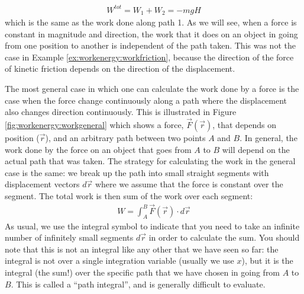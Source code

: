 \begin{example}
\begin{align*}
W^{tot} = W_1 + W_2 = -mgH
\end{align*}
which is the same as the work done along path 1. As we will see, when a force is constant in magnitude and direction, the work that it does on an object in going from one position to another is independent of the path taken. This was not the case in Example \ref{ex:workenergy:workfriction}, because the direction of the force of kinetic friction depends on the direction of the displacement. 
\end{example} 

The most general case in which one can calculate the work done by a force is the case when the force change continuously along a path where the displacement also changes direction continuously. This is illustrated in Figure \ref{fig:workenergy:workgeneral} which shows a force, $\vec F(\vec r)$, that depends on position ($\vec r$), and an arbitrary path between two points $A$ and $B$. In general, the work done by the force on an object that goes from $A$ to $B$ will depend on the actual path that was taken.
The strategy for calculating the work in the general case is the same: we break up the path into small straight segments with displacement vectors $d\vec r$ where we assume that the force is constant over the segment. The total work is then sum of the work over each segment:
\begin{align*}
W = \int_A^B \vec F(\vec r) \cdot d\vec r
\end{align*}
As usual, we use the integral symbol to indicate that you need to take an infinite number of infinitely small segments $d\vec r$ in order to calculate the sum. You should note that this is not an integral like any other that we have seen so far: the integral is not over a single integration variable (usually we use $x$), but it is the integral (the sum!) over the specific path that we have chosen in going from $A$ to $B$. This is called a ``path integral'', and is generally difficult to evaluate. 

